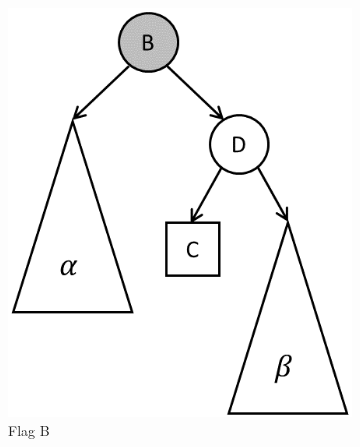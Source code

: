 \documentclass[letterpaper]{article}
\begin{document}
\begin{figure}[!bt]
	\centering
	\begin{subfigure}[b]{0.2\textwidth}\centering
		\includegraphics[width=1\textwidth]{bst_del_2.png}
		\caption{Flag B}
	\end{subfigure}
	\qquad
	\begin{subfigure}[b]{0.2\textwidth}\centering

\end{subfigure}
\end{figure}
\end{document}
